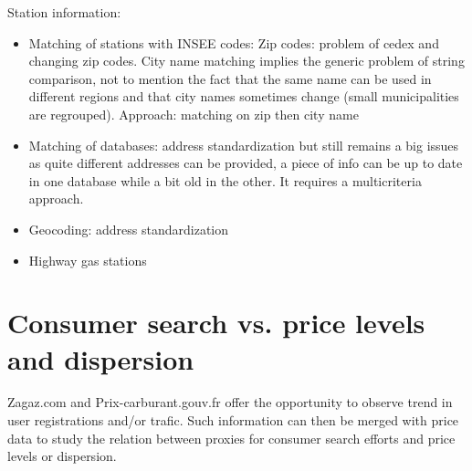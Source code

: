 \documentclass[11pt]{article}
\begin{document}
Station information:
\begin{itemize}
\item Matching of stations with INSEE codes: Zip codes: problem of cedex and changing zip codes. City name matching implies the generic problem of string comparison, not to mention the fact that the same name can be used in different regions and that city names sometimes change (small municipalities are regrouped). Approach: matching on zip then city name
\item Matching of databases: address standardization but still remains a big issues as quite different addresses can be provided, a piece of info can be up to date in one database while a bit old in the other. It requires a multicriteria approach.
\item Geocoding: address standardization
\item Highway gas stations
\end{itemize}

\section{Consumer search vs. price levels and dispersion}

Zagaz.com and Prix-carburant.gouv.fr offer the opportunity to observe trend in user registrations and/or trafic. Such information can then be merged with price data to study the relation between proxies for consumer search efforts and price levels or dispersion.
\end{document}
